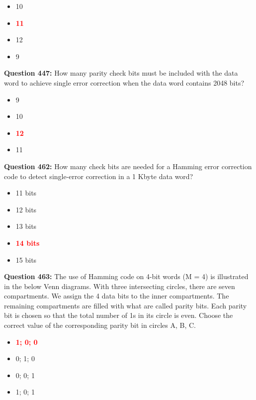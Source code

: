 \documentclass[12pt,a4paper]{article}
\begin{document}
\begin{itemize}
    \item[\textbf{A.}] 10
    \item[\textbf{B.}] \textcolor{red}{\textbf{11}}
    \item[\textbf{C.}] 12
    \item[\textbf{D.}] 9
\end{itemize}

\vspace{0.5cm}

\textbf{Question 447:} How many parity check bits must be included with the data word to achieve single error correction when the data word contains 2048 bits?

\begin{itemize}
    \item[\textbf{A.}] 9
    \item[\textbf{B.}] 10
    \item[\textbf{C.}] \textcolor{red}{\textbf{12}}
    \item[\textbf{D.}] 11
\end{itemize}

\vspace{0.5cm}

\textbf{Question 462:} How many check bits are needed for a Hamming error correction code to detect single-error correction in a 1 Kbyte data word?

\begin{itemize}
    \item[\textbf{A.}] 11 bits
    \item[\textbf{B.}] 12 bits
    \item[\textbf{C.}] 13 bits
    \item[\textbf{D.}] \textcolor{red}{\textbf{14 bits}}
    \item[\textbf{E.}] 15 bits
\end{itemize}

\vspace{0.5cm}

\textbf{Question 463:} The use of Hamming code on 4-bit words (M = 4) is illustrated in the below Venn diagrams. With three intersecting circles, there are seven compartments. We assign the 4 data bits to the inner compartments. The remaining compartments are filled with what are called parity bits. Each parity bit is chosen so that the total number of 1s in its circle is even. Choose the correct value of the corresponding parity bit in circles A, B, C.

\begin{itemize}
    \item[\textbf{A.}] \textcolor{red}{\textbf{1; 0; 0}}
    \item[\textbf{B.}] 0; 1; 0
    \item[\textbf{C.}] 0; 0; 1
    \item[\textbf{D.}] 1; 0; 1
\end{itemize}
\end{document}
